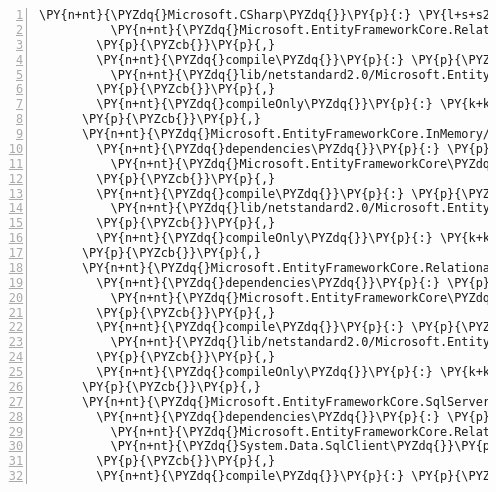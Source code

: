 \begin{Verbatim}[commandchars=\\\{\},numbers=left,firstnumber=1,stepnumber=1,numberblanklines=0]
          \PY{n+nt}{\PYZdq{}Microsoft.CSharp\PYZdq{}}\PY{p}{:} \PY{l+s+s2}{\PYZdq{}4.5.0\PYZhy{}rc1\PYZdq{}}\PY{p}{,}
          \PY{n+nt}{\PYZdq{}Microsoft.EntityFrameworkCore.Relational\PYZdq{}}\PY{p}{:} \PY{l+s+s2}{\PYZdq{}2.1.0\PYZhy{}rc1\PYZhy{}final\PYZdq{}}
        \PY{p}{\PYZcb{}}\PY{p}{,}
        \PY{n+nt}{\PYZdq{}compile\PYZdq{}}\PY{p}{:} \PY{p}{\PYZob{}}
          \PY{n+nt}{\PYZdq{}lib/netstandard2.0/Microsoft.EntityFrameworkCore.Design.dll\PYZdq{}}\PY{p}{:} \PY{p}{\PYZob{}}\PY{p}{\PYZcb{}}
        \PY{p}{\PYZcb{}}\PY{p}{,}
        \PY{n+nt}{\PYZdq{}compileOnly\PYZdq{}}\PY{p}{:} \PY{k+kc}{true}
      \PY{p}{\PYZcb{}}\PY{p}{,}
      \PY{n+nt}{\PYZdq{}Microsoft.EntityFrameworkCore.InMemory/2.1.0\PYZhy{}rc1\PYZhy{}final\PYZdq{}}\PY{p}{:} \PY{p}{\PYZob{}}
        \PY{n+nt}{\PYZdq{}dependencies\PYZdq{}}\PY{p}{:} \PY{p}{\PYZob{}}
          \PY{n+nt}{\PYZdq{}Microsoft.EntityFrameworkCore\PYZdq{}}\PY{p}{:} \PY{l+s+s2}{\PYZdq{}2.1.0\PYZhy{}rc1\PYZhy{}final\PYZdq{}}
        \PY{p}{\PYZcb{}}\PY{p}{,}
        \PY{n+nt}{\PYZdq{}compile\PYZdq{}}\PY{p}{:} \PY{p}{\PYZob{}}
          \PY{n+nt}{\PYZdq{}lib/netstandard2.0/Microsoft.EntityFrameworkCore.InMemory.dll\PYZdq{}}\PY{p}{:} \PY{p}{\PYZob{}}\PY{p}{\PYZcb{}}
        \PY{p}{\PYZcb{}}\PY{p}{,}
        \PY{n+nt}{\PYZdq{}compileOnly\PYZdq{}}\PY{p}{:} \PY{k+kc}{true}
      \PY{p}{\PYZcb{}}\PY{p}{,}
      \PY{n+nt}{\PYZdq{}Microsoft.EntityFrameworkCore.Relational/2.1.0\PYZhy{}rc1\PYZhy{}final\PYZdq{}}\PY{p}{:} \PY{p}{\PYZob{}}
        \PY{n+nt}{\PYZdq{}dependencies\PYZdq{}}\PY{p}{:} \PY{p}{\PYZob{}}
          \PY{n+nt}{\PYZdq{}Microsoft.EntityFrameworkCore\PYZdq{}}\PY{p}{:} \PY{l+s+s2}{\PYZdq{}2.1.0\PYZhy{}rc1\PYZhy{}final\PYZdq{}}
        \PY{p}{\PYZcb{}}\PY{p}{,}
        \PY{n+nt}{\PYZdq{}compile\PYZdq{}}\PY{p}{:} \PY{p}{\PYZob{}}
          \PY{n+nt}{\PYZdq{}lib/netstandard2.0/Microsoft.EntityFrameworkCore.Relational.dll\PYZdq{}}\PY{p}{:} \PY{p}{\PYZob{}}\PY{p}{\PYZcb{}}
        \PY{p}{\PYZcb{}}\PY{p}{,}
        \PY{n+nt}{\PYZdq{}compileOnly\PYZdq{}}\PY{p}{:} \PY{k+kc}{true}
      \PY{p}{\PYZcb{}}\PY{p}{,}
      \PY{n+nt}{\PYZdq{}Microsoft.EntityFrameworkCore.SqlServer/2.1.0\PYZhy{}rc1\PYZhy{}final\PYZdq{}}\PY{p}{:} \PY{p}{\PYZob{}}
        \PY{n+nt}{\PYZdq{}dependencies\PYZdq{}}\PY{p}{:} \PY{p}{\PYZob{}}
          \PY{n+nt}{\PYZdq{}Microsoft.EntityFrameworkCore.Relational\PYZdq{}}\PY{p}{:} \PY{l+s+s2}{\PYZdq{}2.1.0\PYZhy{}rc1\PYZhy{}final\PYZdq{}}\PY{p}{,}
          \PY{n+nt}{\PYZdq{}System.Data.SqlClient\PYZdq{}}\PY{p}{:} \PY{l+s+s2}{\PYZdq{}4.5.0\PYZhy{}rc1\PYZdq{}}
        \PY{p}{\PYZcb{}}\PY{p}{,}
        \PY{n+nt}{\PYZdq{}compile\PYZdq{}}\PY{p}{:} \PY{p}{\PYZob{}}

\end{Verbatim}
